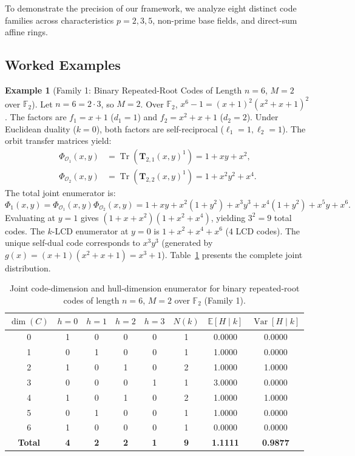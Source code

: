 \documentclass[preprint,12pt]{elsarticle}
\newcommand{\Tr}{\operatorname{Tr}}
\newcommand{\Var}{\operatorname{Var}}
\numberwithin{equation}{section}
\theoremstyle{plain}
\theoremstyle{definition}
\newtheorem{example}[theorem]{Example}
\theoremstyle{remark}
\begin{document}
To demonstrate the precision of our framework, we analyze eight distinct code families across characteristics $p=2, 3, 5$, non-prime base fields, and direct-sum affine rings.

\subsection{Worked Examples}

\begin{example}[Family 1: Binary Repeated-Root Codes of Length $n=6$, $M=2$ over $\mathbb{F}_2$]
Let $n = 6 = 2 \cdot 3$, so $M = 2$. Over $\mathbb{F}_2$, $x^6 - 1 = (x+1)^2 (x^2+x+1)^2$.
The factors are $f_1 = x+1$ ($d_1=1$) and $f_2 = x^2+x+1$ ($d_2=2$). Under Euclidean duality ($k=0$), both factors are self-reciprocal ($\ell_1 = 1, \ell_2 = 1$).
The orbit transfer matrices yield:
\begin{align*}
    \Phi_{\mathcal{O}_1}(x, y) &= \Tr(\mathbf{T}_{2, 1}(x, y)^1) = 1 + x y + x^2, \\
    \Phi_{\mathcal{O}_2}(x, y) &= \Tr(\mathbf{T}_{2, 2}(x, y)^1) = 1 + x^2 y^2 + x^4.
\end{align*}
The total joint enumerator is:
\begin{equation}
    \Phi_1(x, y) = \Phi_{\mathcal{O}_1}(x, y) \Phi_{\mathcal{O}_2}(x, y) = 1 + x y + x^2(1 + y^2) + x^3 y^3 + x^4(1 + y^2) + x^5 y + x^6.
\end{equation}
Evaluating at $y=1$ gives $(1+x+x^2)(1+x^2+x^4)$, yielding $3^2 = 9$ total codes. The $k$-LCD enumerator at $y=0$ is $1 + x^2 + x^4 + x^6$ ($4$ LCD codes). The unique self-dual code corresponds to $x^3 y^3$ (generated by $g(x) = (x+1)(x^2+x+1) = x^3+1$). Table~\ref{tab:family1} presents the complete joint distribution.
\end{example}

\begin{table}[htbp]
\centering
\small
\caption{Joint code-dimension and hull-dimension enumerator for binary repeated-root codes of length $n=6$, $M=2$ over $\mathbb{F}_2$ (Family 1).}
\label{tab:family1}
\begin{tabular}{cccccccc}
\toprule
$\dim(C)$ & $h=0$ & $h=1$ & $h=2$ & $h=3$ & $N(k)$ & $\mathbb{E}[H \mid k]$ & $\Var[H \mid k]$ \\
\midrule
0 & 1 & 0 & 0 & 0 & 1 & 0.0000 & 0.0000 \\
1 & 0 & 1 & 0 & 0 & 1 & 1.0000 & 0.0000 \\
2 & 1 & 0 & 1 & 0 & 2 & 1.0000 & 1.0000 \\
3 & 0 & 0 & 0 & 1 & 1 & 3.0000 & 0.0000 \\
4 & 1 & 0 & 1 & 0 & 2 & 1.0000 & 1.0000 \\
5 & 0 & 1 & 0 & 0 & 1 & 1.0000 & 0.0000 \\
6 & 1 & 0 & 0 & 0 & 1 & 0.0000 & 0.0000 \\
\midrule
\textbf{Total} & \textbf{4} & \textbf{2} & \textbf{2} & \textbf{1} & \textbf{9} & \textbf{1.1111} & \textbf{0.9877} \\
\bottomrule
\end{tabular}
\end{table}
\end{document}
